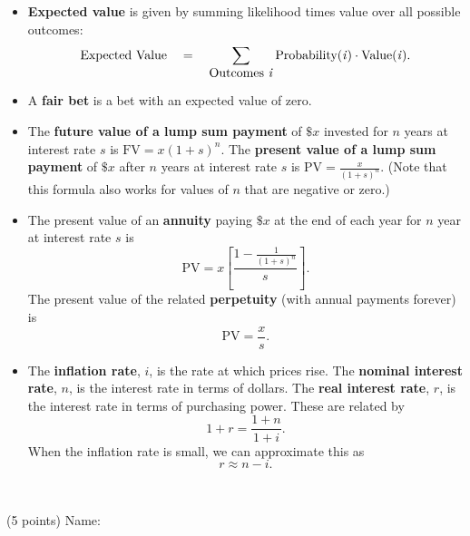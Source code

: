 \documentclass[twoside]{article}
\begin{document}
\begin{EXAM}
\begin{itemize}
\begin{comment}
\item For questions or other emergencies, call me at x5124 or 206-351-5719.
\end{comment}

\item \textbf{Expected value} is given by summing likelihood times value over all possible outcomes:
\[
\mbox{Expected Value}\ \ \  = \ \ \ \sum_{\mbox{Outcomes \emph{i}}} \mbox{Probability(\emph{i})} \cdot \mbox{Value(\emph{i})}.
\]


\item A \textbf{fair bet} is a bet with an expected value of zero.

\item The \textbf{future value of a lump sum payment} of $\$x$ invested for $n$ years at interest rate $s$ is $\displaystyle \mbox{FV} = x(1+s)^{n}$. The \textbf{present value of a lump sum payment} of $\$x$ after $n$ years at interest rate $s$ is $\displaystyle \mbox{PV} = \frac{x}{(1+s)^{n}}.$ (Note that this formula also works for values of $n$ that are negative or zero.)

\item The present value of an \textbf{annuity} paying $\$x$ at the end of each year for $n$ year at interest rate $s$ is
\[
\mbox{PV}=x\left[ \frac{1 - \displaystyle\frac{1}{(1+s)^n}}{s}\right].
\]
The present value of the related \textbf{perpetuity} (with annual payments forever) is
\[
\mbox{PV}=\frac{x}{s}.
\]

\item The \textbf{inflation rate}, $i$, is the rate at which prices rise. The \textbf{nominal interest rate}, $n$, is the interest rate in terms of dollars. The \textbf{real interest rate}, $r$, is the interest rate in terms of purchasing power. These are related by
\[
1+r=\frac{1+n}{1+i}.
\]
When the inflation rate is small, we can approximate this as
\[
r \approx n-i.
\]


\end{itemize}




\clearpage\
\clearpage
\end{EXAM}

\begin{EXAM}

\vspace*{-2cm}

\begin{flushright}
(5 points) Name: \hspace*{1in}

\medskip
\end{flushright}

\bigskip

\end{EXAM}
\end{document}
